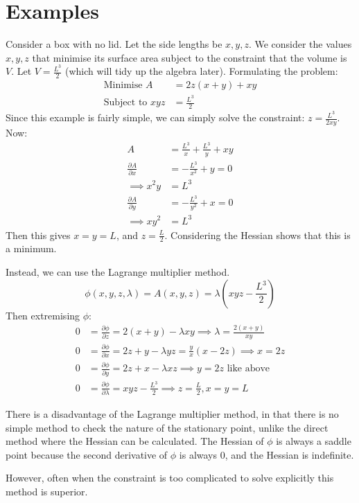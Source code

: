 \documentclass[../Main.tex]{subfiles}
\begin{document}
\section{Examples}
\begin{example}
    Consider a box with no lid. Let the side lengths be $x, y, z$. We consider the values $x, y, z$ that minimise its surface area subject to the constraint that the volume is $V$. Let $V = \frac{L^3}{2}$ (which will tidy up the algebra later). Formulating the problem:
    \begin{align*}
        \text{Minimise } A &= 2z(x + y) + xy \\
        \text{Subject to } xyz &= \frac{L^3}{2}
    \end{align*}
    Since this example is fairly simple, we can simply solve the constraint: $z = \frac{L^3}{2xy}$. Now:
    \begin{align*}
        A &= \frac{L^3}{x} + \frac{L^3}{y} + xy \\
        \frac{\partial A}{\partial x} &= -\frac{L^3}{x^2} + y = 0 \\
        \implies x^2y &= L^3 \\
        \frac{\partial A}{\partial y} &= -\frac{L^3}{y^2} + x = 0 \\
        \implies xy^2 &= L^3
    \end{align*}
    Then this gives $x = y = L$, and $z = \frac{L}{2}$. Considering the Hessian shows that this is a minimum.

    Instead, we can use the Lagrange multiplier method.
    \begin{equation*}
        \phi(x, y, z, \lambda) = A(x, y, z) = \lambda(xyz - \frac{L^3}{2})
    \end{equation*}
    Then extremising $\phi$:
    \begin{align*}
        0 &= \frac{\partial \phi}{\partial z} = 2(x + y) - \lambda xy \implies \lambda = \frac{2(x + y)}{xy} \\
        0 &= \frac{\partial \phi}{\partial x} = 2z + y - \lambda yz = \frac{y}{x}(x - 2z) \implies x = 2z \\
        0 &= \frac{\partial \phi}{\partial y} = 2z + x - \lambda xz \implies y = 2z \text{ like above} \\
        0 &= \frac{\partial \phi}{\partial \lambda} = xyz - \frac{L^3}{2} \implies z = \frac{L}{2}, x = y = L
    \end{align*}
\end{example}
There is a disadvantage of the Lagrange multiplier method, in that there is no simple method to check the nature of the stationary point, unlike the direct method where the Hessian can be calculated. The Hessian of $\phi$ is always a saddle point because the second derivative of $\phi$ is always 0, and the Hessian is indefinite.

However, often when the constraint is too complicated to solve explicitly this method is superior.
\end{document}
